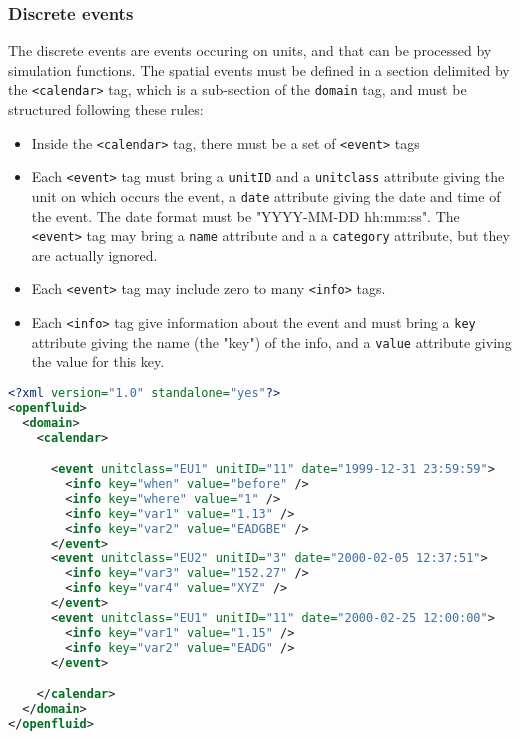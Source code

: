\bigskip



\bigskip

\subsubsection{Discrete events}

The discrete events are events occuring on units, and that can be processed by simulation functions. 
\noindent The spatial events must be defined in a section delimited
by the \texttt{<calendar>} tag, which is a sub-section of the \texttt{domain}
tag, and must be structured following these rules:

\begin{itemize}
  \item Inside the \texttt{<calendar>} tag, there must be a set of \texttt{<event>} tags 
  \item Each \texttt{<event>} tag must bring a \texttt{unitID} and a 
  \texttt{unitclass} attribute giving the unit on which occurs the event, a 
  \texttt{date} attribute giving the date and time of the event. The date
  format must be "YYYY-MM-DD hh:mm:ss". The \texttt{<event>} tag may bring a
  \texttt{name} attribute and a a \texttt{category} attribute, but they are
  actually ignored.
  \item Each \texttt{<event>} tag may include zero to many \texttt{<info>} tags.
  \item Each \texttt{<info>} tag give information about the event and must
  bring a \texttt{key} attribute giving the name (the "key") of the info, and a
  \texttt{value} attribute giving the value for this key.
\end{itemize}  
  
\begin{lstlisting}[language=xml,title=\footnotesize\textit{example}]
<?xml version="1.0" standalone="yes"?>
<openfluid>
  <domain>
    <calendar>

      <event unitclass="EU1" unitID="11" date="1999-12-31 23:59:59">
        <info key="when" value="before" />
        <info key="where" value="1" />
        <info key="var1" value="1.13" />
        <info key="var2" value="EADGBE" />
      </event>
      <event unitclass="EU2" unitID="3" date="2000-02-05 12:37:51">
        <info key="var3" value="152.27" />
        <info key="var4" value="XYZ" />
      </event>
      <event unitclass="EU1" unitID="11" date="2000-02-25 12:00:00">
        <info key="var1" value="1.15" />
        <info key="var2" value="EADG" />
      </event>

    </calendar>
  </domain>
</openfluid>
\end{lstlisting}
\bigskip

